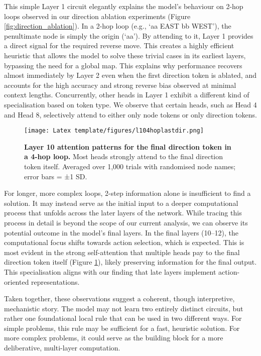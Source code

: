 This simple Layer 1 circuit elegantly explains the model's behaviour on 2-hop loops observed in our direction ablation experiments (Figure \ref{fig:direction_ablation}). In a 2-hop loop (e.g., `aa EAST bb WEST'), the penultimate node is simply the origin (`aa'). By attending to it, Layer 1 provides a direct signal for the required reverse move. This creates a highly efficient heuristic that allows the model to solve these trivial cases in its earliest layers, bypassing the need for a global map. This explains why performance recovers almost immediately by Layer 2 even when the first direction token is ablated, and accounts for the high accuracy and strong reverse bias observed at minimal context lengths. Concurrently, other heads in Layer 1 exhibit a different kind of specialisation based on token type. We observe that certain heads, such as Head 4 and Head 8, selectively attend to either only node tokens or only direction tokens.

\begin{figure}[htbp]
\ContinuedFloat
\centering
\texttt{[image: Latex template/figures/l104hoplastdir.png]}
\caption[Layer 10 attention patterns for the final direction token.]{\textbf{Layer 10 attention patterns for the final direction token in a 4-hop loop.} Most heads strongly attend to the final direction token itself. Averaged over 1,000 trials with randomised node names; error bars = ±1 SD.}
\label{fig:layer10_attention_patterns}
\end{figure}


For longer, more complex loops, 2-step information alone is insufficient to find a solution. It may instead serve as the initial input to a deeper computational process that unfolds across the later layers of the network. While tracing this process in detail is beyond the scope of our current analysis, we can observe its potential outcome in the model's final layers. In the final layers (10–12), the computational focus shifts towards action selection, which is expected. This is most evident in the strong self-attention that multiple heads pay to the final direction token itself (Figure \ref{fig:layer10_attention_patterns}), likely preserving information for the final output. This specialisation aligns with our finding that late layers implement action-oriented representations.

Taken together, these observations suggest a coherent, though interpretive, mechanistic story. The model may not learn two entirely distinct circuits, but rather one foundational local rule that can be used in two different ways. For simple problems, this rule may be sufficient for a fast, heuristic solution. For more complex problems, it could serve as the building block for a more deliberative, multi-layer computation.


